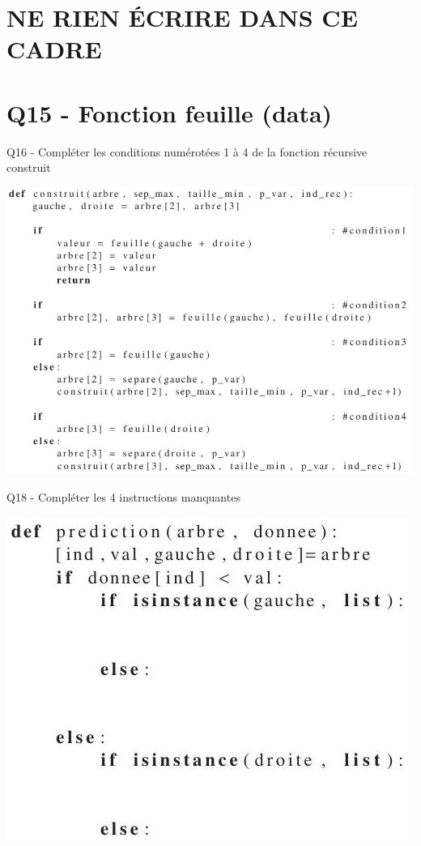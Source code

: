 \documentclass[10pt]{article}
\begin{document}
\section{NE RIEN ÉCRIRE DANS CE CADRE}
\section{Q15 - Fonction feuille (data)}
Q16 - Compléter les conditions numérotées 1 à 4 de la fonction récursive construit

\includegraphics[max width=\textwidth]{2022_02_02_1af495ea60fb42b668bfg-18}

Q18 - Compléter les 4 instructions manquantes

\includegraphics[max width=\textwidth]{2022_02_02_1af495ea60fb42b668bfg-19}
\end{document}

